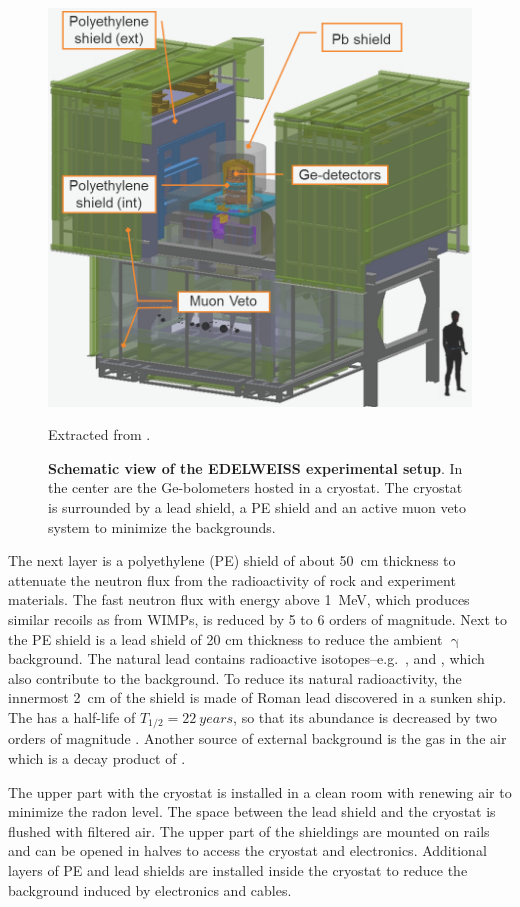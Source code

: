   \begin{figure}[ht]
    \centering
    \includegraphics[width=0.75\textwidth{}]{./fig/exp_setup.png}
    \caption{\textbf{Schematic view of the EDELWEISS experimental setup}.
    In the center are the Ge-bolometers hosted in a cryostat. The cryostat is surrounded by a lead shield, a PE shield and an active muon veto system to minimize the backgrounds.} Extracted from \cite{Kef16}.
    \label{fig:exp-setup}
  \end{figure}


  The next layer is a polyethylene (PE) shield of about \SI{50}{cm} thickness to attenuate the neutron flux from the radioactivity of rock and experiment materials. The fast neutron flux with energy above \SI{1}{MeV}, which produces similar recoils as from WIMPs, is reduced by 5 to 6 orders of magnitude. %
  Next to the PE shield is a lead shield of 20 cm thickness to reduce the ambient $\upgamma$ background. The natural lead contains radioactive isotopes--e.g.\ ,  and , which also contribute to the background. To reduce its natural radioactivity, the innermost \SI{2}{cm} of the shield is made of Roman lead discovered in a sunken ship. The  has a half-life of $T_{1/2}=\SI{22}{years}$, so that its abundance is decreased by two orders of magnitude \cite{Sch13a}.
  Another source of external background is the  gas in the air which is a decay product of .

  The upper part with the cryostat is installed in a clean room with renewing air to minimize the radon level. The space between the lead shield and the cryostat is flushed with filtered air.
  The upper part of the shieldings are mounted on rails and can be opened in halves to access the cryostat and electronics. Additional layers of PE and lead shields are installed inside the cryostat to reduce the background induced by electronics and cables.

